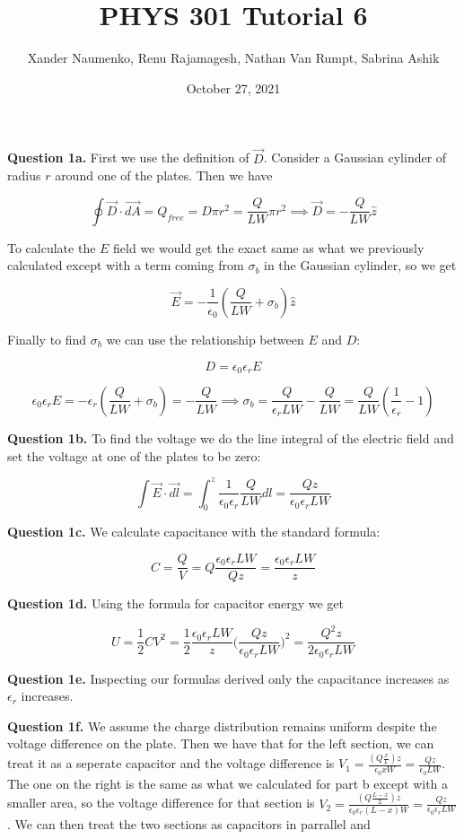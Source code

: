 \documentclass[letterpaper, reqno,11pt]{article}
\begin{document}
\title{PHYS 301 Tutorial 6}
\date{October 27, 2021}
\author{Xander Naumenko, Renu Rajamagesh, Nathan Van Rumpt, Sabrina Ashik}
\maketitle


{\noindent\bf Question 1a.} First we use the definition of $\vec D$. Consider a Gaussian cylinder of radius $r$ around one of the plates. Then we have 

$$
    \oint \vec D\cdot\vec {dA}=Q_{free}=D\pi r^2=\frac{Q}{LW}\pi r^2\implies \vec D=-\frac{Q}{LW}\hat z
$$

To calculate the $E$ field we would get the exact same as what we previously calculated except with a term coming from $\sigma_b$ in the Gaussian cylinder, so we get 

$$
    \vec E=-\frac1{\epsilon_0}(\frac Q{LW}+\sigma_b)\hat z
$$

Finally to find $\sigma_b$ we can use the relationship between $E$ and $D$: 

$$
    D=\epsilon_0\epsilon_r E
$$

$$
    \epsilon_0\epsilon_r E=-\epsilon_r(\frac Q{LW}+\sigma_b)=-\frac{Q}{LW}\implies \sigma_b=\frac{Q}{\epsilon_rLW}-\frac Q{LW}=\frac{Q}{LW}(\frac1{\epsilon_r}-1)
$$

{\noindent\bf Question 1b.} To find the voltage we do the line integral of the electric field and set the voltage at one of the plates to be zero: 

$$
    \int \vec E\cdot \vec{dl}=\int_0^z\frac1{\epsilon_0\epsilon_r}\frac{Q}{LW}dl=\frac{Qz}{\epsilon_0\epsilon_rLW}
$$

{\noindent\bf Question 1c.} We calculate capacitance with the standard formula: 

$$
    C=\frac{Q}{V}=Q\frac{\epsilon_0\epsilon_rLW}{Qz}=\frac{\epsilon_0\epsilon_rLW}{z}
$$

{\noindent\bf Question 1d.} Using the formula for capacitor energy we get 

$$
    U=\frac12 CV^2=\frac12 \frac{\epsilon_0\epsilon_r LW}{z}\bigg(\frac{Qz}{\epsilon_0\epsilon_r LW}\bigg)^2=\frac{Q^2z}{2\epsilon_0\epsilon_r LW}
$$

{\noindent\bf Question 1e.} Inspecting our formulas derived only the capacitance increases as $\epsilon_r$ increases. 

{\noindent\bf Question 1f.} We assume the charge distribution remains uniform despite the voltage difference on the plate. Then we have that for the left section, we can treat it as a seperate capacitor and the voltage difference is $V_1=\frac{(Q\frac xL)z}{\epsilon_0 xW}=\frac{Qz}{\epsilon_0LW}$. The one on the right is the same as what we calculated for part b except with a smaller area, so the voltage difference for that section is $V_2=\frac{(Q\frac{L-x}{L})z}{\epsilon_0\epsilon_r (L-x)W}=\frac{Qz}{\epsilon_0\epsilon_rLW}$. We can then treat the two sections as capacitors in parrallel and 
\end{document}
